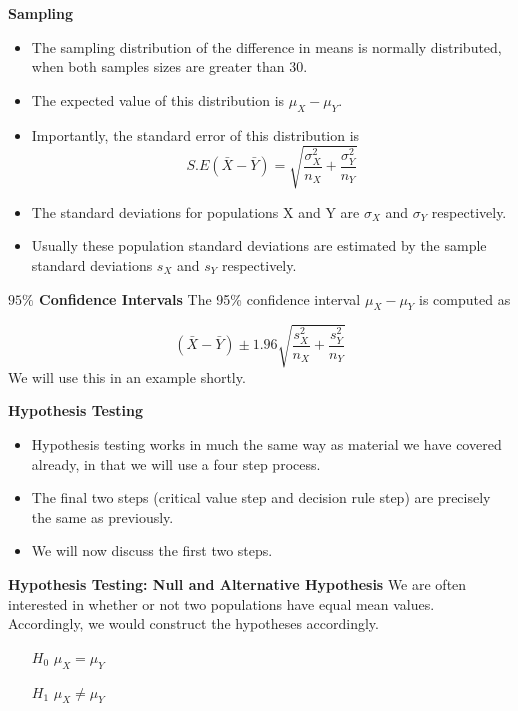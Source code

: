 \documentclass[a4]{beamer}
\begin{document}

\noindent \textbf{Sampling}
\begin{itemize}
\item The sampling distribution of the difference in means is normally distributed, when both samples sizes are greater than 30.
\item The expected value of this distribution is $\mu_X - \mu_Y$.
\item Importantly, the standard error of this distribution is
\[ S.E(\bar{X} - \bar{Y}) = \sqrt{\frac{\sigma^2_X}{n_X} + \frac{\sigma^2_Y}{n_Y}} \]
\item The standard deviations for populations X and Y are $\sigma_X$ and $\sigma_Y$ respectively.
\item Usually these population standard deviations are estimated by the sample standard deviations $s_X$ and $s_Y$ respectively.
\end{itemize}



\noindent \textbf{$95\%$ Confidence Intervals}
The 95\% confidence interval $\mu_X - \mu_Y$ is computed as

\[ (\bar{X} - \bar{Y}) \pm 1.96 \sqrt{\frac{s^2_X}{n_X} + \frac{s^2_Y}{n_Y}}\]
We will use this in an example shortly.


\noindent \textbf{Hypothesis Testing}
\begin{itemize}
\item Hypothesis testing works in much the same way as material we have covered already, in that we will use a four step process.
\item The final two steps (critical value step and decision rule step) are precisely the same as previously.
\item We will now discuss the first two steps.
\end{itemize}




\noindent \textbf{Hypothesis Testing: Null and Alternative Hypothesis}
We are often interested in whether or not two populations have equal mean values. Accordingly, we would construct the hypotheses accordingly.
\begin{itemize}
\item[$H_0$] $\mu_X = \mu_Y$
\item[$H_1$] $\mu_X \neq \mu_Y$
\end{itemize}
\end{document}
